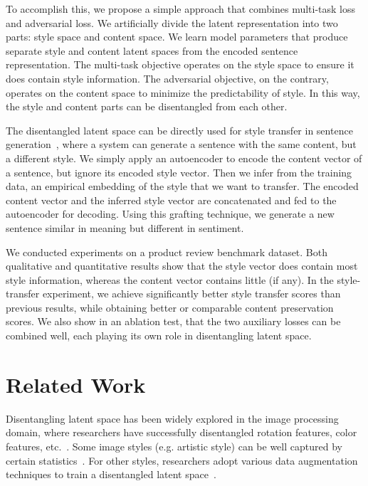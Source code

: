 \documentclass[11pt,a4paper]{article}
\begin{document}
To accomplish this, we propose a simple approach that combines multi-task loss and adversarial loss. We artificially divide the latent representation into two parts: style space and content space.
We learn model parameters that produce separate style and content latent spaces from the encoded sentence representation. The multi-task objective operates on the style space to ensure it does contain style information.
The adversarial objective, on the contrary, operates on the content space to minimize the predictability of style. In this way, the style and content parts can be disentangled from each other.

The disentangled latent space can be directly used for style transfer in sentence generation~\cite{fu2017style,shen2017style}, where a system can generate a sentence with the same content, but a different style. We simply apply an autoencoder to encode the content vector of a sentence, but ignore its encoded style vector. Then we infer from the training data, an empirical embedding of the style that we want to transfer. The encoded content vector and the inferred style vector are concatenated and fed to the autoencoder for decoding. Using this grafting technique, we generate a new sentence similar in meaning but different in sentiment.

We conducted experiments on a product review benchmark dataset. Both qualitative and quantitative results show that the style vector does contain most style information, whereas the content vector contains little (if any). In the style-transfer experiment, we achieve significantly better style transfer scores than previous results, while obtaining better or comparable content preservation scores.  We also show in an ablation test, that the two auxiliary losses can be combined well, each playing its own role in disentangling latent space.


\section{Related Work}


Disentangling latent space has been widely explored in the image processing domain, where researchers have successfully disentangled rotation features, color features, etc.~\cite{chen2016infogan,luan2017deep}. Some image styles (e.g. artistic style) can be well captured by certain statistics~\cite{gatys2016image}. For other styles, researchers adopt various data augmentation techniques to train a disentangled latent space~\cite{champandard2016semantic,kulkarni2015deep}.
\end{document}
